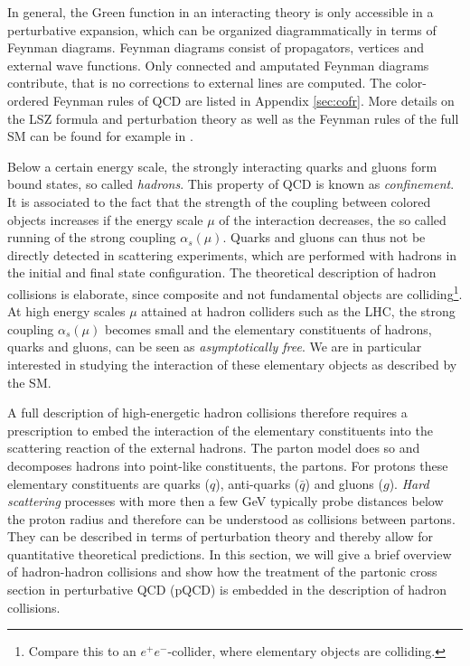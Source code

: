 In general, the Green function in an interacting theory is only accessible in a perturbative expansion,
which can be organized diagrammatically in terms of Feynman diagrams. Feynman diagrams consist
of propagators, vertices and external wave functions. Only
connected and amputated Feynman diagrams contribute, that is no corrections to external lines are
computed. The color-ordered Feynman rules
of QCD are listed in Appendix \ref{sec:cofr}. More details on the LSZ
formula and perturbation theory as well as the Feynman rules of the
full SM can
be found for example in \cite{Bohm:2001yx,Schwartz:2013pla}. 


Below a certain energy scale, the strongly interacting quarks and gluons form bound states, so called \textit{hadrons}. This property of
QCD is known as \textit{confinement}. It is associated to the fact
that the strength of the coupling
between colored objects increases if the energy scale $\mu$ of the interaction decreases, the so called running of the
strong coupling $\alpha_s(\mu)$. Quarks and gluons can thus not be directly detected in scattering
experiments, which are performed with hadrons in the initial and final
state configuration. The theoretical description of hadron collisions is elaborate, since
composite and not fundamental objects are colliding\footnote{Compare this to an $e^+e^-$-collider, where
  elementary objects are colliding.}. At high energy scales $\mu$
attained at hadron colliders such as the LHC, the strong
coupling $\alpha_s(\mu)$ becomes small and the elementary constituents
of hadrons, quarks and gluons, can be seen as \textit{asymptotically
  free}. We are in particular interested in studying the interaction
of these elementary objects as described by the SM.


A full description of high-energetic hadron collisions therefore requires a prescription to embed the interaction
of the elementary constituents into the scattering reaction
of the external hadrons. The parton model \cite{Feynman1969} does so
and decomposes hadrons into point-like constituents, the partons. For
protons these elementary constituents are quarks ($q$), anti-quarks
($\bar{q}$) and gluons ($g$). \textit{Hard
scattering} processes with more then a few GeV typically
probe distances below the proton radius and therefore can be understood as
collisions between partons. They can be described in terms of
perturbation theory and thereby allow for quantitative theoretical predictions. In this section, we will give a brief overview of hadron-hadron collisions and
show how the treatment of the partonic cross section in perturbative QCD
(pQCD) is embedded in the description of hadron collisions.

